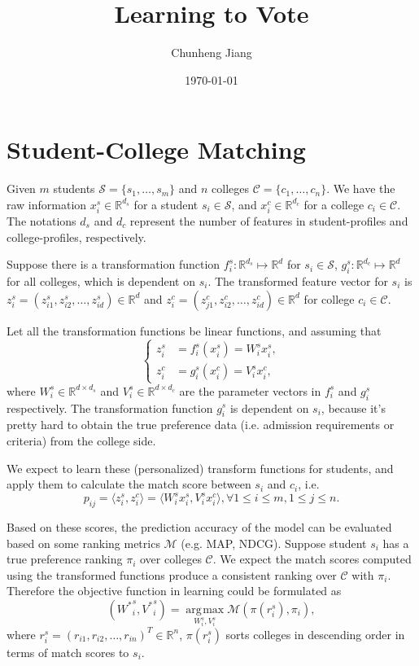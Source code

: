 \documentclass[12pt]{article}
\title{Learning to Vote}
\author{Chunheng Jiang}
\date{\today}
\DeclareMathOperator*{\argmax}{\mathrm{\arg\!\max}}
\begin{document}
\section*{Student-College Matching}
Given $m$ students $\mathcal S = \{s_1,\ldots, s_m\}$ and $n$ colleges $\mathcal C = \{c_1,\ldots, c_n\}$. We have the raw information $x_i^s\in \mathbb R^{d_s}$ for a student $s_i\in \mathcal S$, and $x_i^c\in \mathbb R^{d_c}$ for a college $c_i\in \mathcal C$. The notations $d_s$ and $d_c$ represent the number of features in student-profiles and college-profiles, respectively.

Suppose there is a transformation function $f_i^s: \mathbb R^{d_s}\mapsto \mathbb R^d$ for $s_i\in \mathcal S$, 
$g_i^s:\mathbb R^{d_c}\mapsto \mathbb R^d$ for all colleges, which is dependent on $s_i$. The transformed feature vector for $s_i$ is $z_i^s = (z_{i1}^s, z_{i2}^s,\ldots, z_{id}^s)\in \mathbb R^d$ and $z_i^c = (z_{j1}^c, z_{i2}^c,\ldots, z_{id}^c)\in \mathbb R^d$ for college $c_i\in \mathcal C$.

Let all the transformation functions be linear functions, and assuming that 
\[
\left\{
\begin{array}{rl}
z_i^s & = f_i^s(x_i^s) = W_i^s x_i^s,\\
z_i^c & = g_i^s(x_i^c) = V_i^s x_i^c,
\end{array}
\right.
\]
where $W_i^s\in \mathbb R^{d\times d_s}$ and $V_i^s \in \mathbb R^{d\times d_c}$ are the parameter vectors in $f_i^s$ and $g_i^s$ respectively. The transformation function $g_i^s$ is dependent on $s_i$, because it's pretty hard to obtain the true preference data (i.e. admission requirements or criteria) from the college side.

We expect to learn these (personalized) transform functions for students, and apply them to calculate the match score between $s_i$ and $c_i$, i.e.
\[
p_{ij} = \langle z_i^s,z_i^c\rangle = \langle W_i^s x_i^s,V_i^s x_i^c\rangle, \forall 1\le i\le m, 1\le j\le n.
\]

Based on these scores, the prediction accuracy of the model can be evaluated based on some ranking metrics $\mathcal M$ (e.g. MAP, NDCG). Suppose student $s_i$ has a true preference ranking $\pi_i$ over colleges $\mathcal C$. We expect the match scores computed using the transformed functions produce a consistent ranking over $\mathcal C$ with $\pi_i$. Therefore the objective function in learning could be formulated as
\[
({W^*}_i^s, {V^*}_i^s) = \argmax\limits_{W_i^s,V_i^s} \mathcal M(\pi(r_i^s),\pi_i),
\]
where $r_i^s =(r_{i1}, r_{i2}, \ldots, r_{in})^T\in \mathbb R^n$, $\pi(r_i^s)$ sorts colleges in descending order in terms of  match scores to $s_i$.
\end{document}
